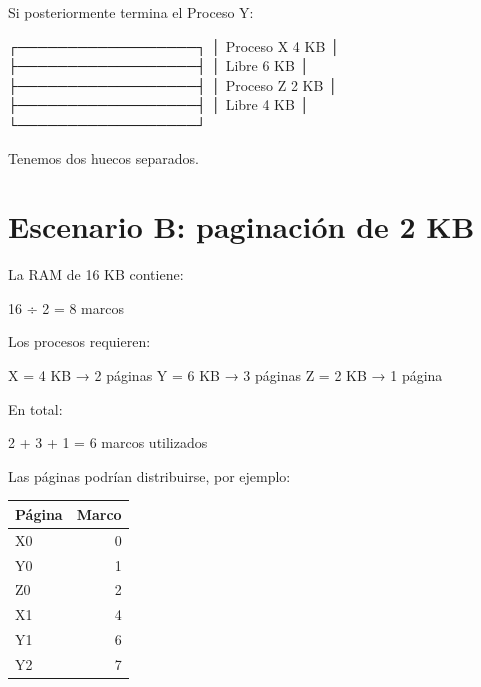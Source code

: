 \documentclass[
  spanish,
  letterpaper,
]{scrbook}
\newenvironment{Shaded}{\begin{snugshade}}{\end{snugshade}}
\newcommand{\NormalTok}[1]{\textcolor[rgb]{0.00,0.23,0.31}{#1}}
\newcounter{none} %
\begin{document}
Si posteriormente termina el Proceso Y:

\begin{Shaded}
\begin{Highlighting}[]
\NormalTok{┌──────────────────┐}
\NormalTok{│ Proceso X   4 KB │}
\NormalTok{├──────────────────┤}
\NormalTok{│ Libre       6 KB │}
\NormalTok{├──────────────────┤}
\NormalTok{│ Proceso Z   2 KB │}
\NormalTok{├──────────────────┤}
\NormalTok{│ Libre       4 KB │}
\NormalTok{└──────────────────┘}
\end{Highlighting}
\end{Shaded}

Tenemos dos huecos separados.

\section{Escenario B: paginación de 2
KB}\label{escenario-b-paginaciuxf3n-de-2-kb}

La RAM de 16 KB contiene:

\begin{Shaded}
\begin{Highlighting}[]
\NormalTok{16 ÷ 2 = 8 marcos}
\end{Highlighting}
\end{Shaded}

Los procesos requieren:

\begin{Shaded}
\begin{Highlighting}[]
\NormalTok{X = 4 KB → 2 páginas}
\NormalTok{Y = 6 KB → 3 páginas}
\NormalTok{Z = 2 KB → 1 página}
\end{Highlighting}
\end{Shaded}

En total:

\begin{Shaded}
\begin{Highlighting}[]
\NormalTok{2 + 3 + 1 = 6 marcos utilizados}
\end{Highlighting}
\end{Shaded}

Las páginas podrían distribuirse, por ejemplo:

{\def\LTcaptype{none} %
\begin{longtable}[]{@{}lr@{}}
\toprule\noalign{}
Página & Marco \\
\midrule\noalign{}
\endhead
\bottomrule\noalign{}
\endlastfoot
X0 & 0 \\
Y0 & 1 \\
Z0 & 2 \\
X1 & 4 \\
Y1 & 6 \\
Y2 & 7 \\
\end{longtable}
}
\end{document}
